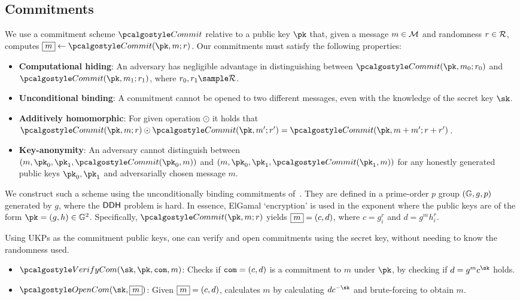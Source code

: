 \subsection{Commitments}
We use a commitment scheme $\commit$ relative to a public key $\pk$ that, given a message $m \in \mathcal{M}$ and randomness $r \in \mathcal{R}$,
computes $\comm{m} \gets \commit(\pk, m;r)$. 
Our commitments must satisfy the following properties: 
\begin{itemize}
    \item \textbf{Computational hiding}: An adversary has negligible advantage in distinguishing between $\commit(\pk, m_0;r_0)$ 
    and $\commit(\pk, m_1;r_1)$, where $r_0, r_1 \sample \randspace$.
    \item \textbf{Unconditional binding}: A commitment cannot be opened to two different messages, even with the knowledge of the secret key $\sk$.
    \item \textbf{Additively homomorphic}: For given operation $\odot$ it holds that \\
     $\commit(\pk, m;r) \odot \commit(\pk, m';r') = \commit(\pk, m+m';r+r')$.
    \item \textbf{Key-anonymity}: An adversary cannot distinguish between \\
     $(m, \pk_0, \pk_1, \commit(\pk_0, m))$ and $(m, \pk_0, \pk_1, \commit(\pk_1, m))$ for any honestly generated public keys $\pk_0, \pk_1$ and adversarially chosen message $m$.
\end{itemize}

We construct such a scheme using the unconditionally binding commitments of~\cite{fauzi2019quisquis}. They are defined in a prime-order $p$ group $(\mathbb{G}, g, p)$ generated by $g$, where the $\textup{\textsf{DDH}}$ problem is hard.
In essence, ElGamal `encryption' is used in the exponent where the public keys are of the form $\pk = (g, h) \in \group^2$. 
Specifically,  
 $\commit(\pk, m; r)$ yields $\fbox{$m$} = (c, d)$, where $c = g_i^r$ and $d = g^m h_i^r$.

 Using UKPs as the commitment public keys, one can verify and open commitments using the secret key, without needing to know the randomness used.
\begin{itemize}
    \item $\verifycom(\sk, \pk, \com, m)$: Checks if $\texttt{com} = (c,d)$ is a commitment to $m$ under $\pk$, by checking if $ d = g^m c^\sk $ holds.
    \item $\opencom(\sk, \comm{m})$: Given $\fbox{$m$} = (c, d)$, calculates $m$ by calculating $dc^{-\sk}$ and brute-forcing to obtain $m$.
\end{itemize}